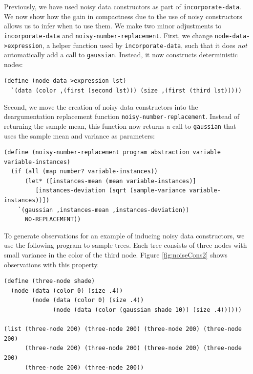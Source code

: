 \documentclass[a4paper,10pt]{article}
\begin{document}
Previously, we have used noisy data constructors as part of \texttt{incorporate-data}. We now show how the gain in compactness due to the use of noisy constructors allows us to infer when to use them. We make two minor adjustments to \texttt{incorporate-data} and \texttt{noisy-number-replacement}. First, we change \texttt{node-data->expression}, a helper function used by \texttt{incorporate-data}, such that it does \textit{not} automatically add a call to \texttt{gaussian}. Instead, it now constructs deterministic nodes:
\begin{lstlisting}[frame=trblsingle]
(define (node-data->expression lst)
  `(data (color ,(first (second lst))) (size ,(first (third lst)))))
\end{lstlisting}
Second, we move the creation of noisy data constructors into the deargumentation replacement function \texttt{noisy-number-replacement}. Instead of returning the sample mean, this function now returns a call to \texttt{gaussian} that uses the sample mean and variance as parameters:
\begin{lstlisting}[frame=trblsingle]
(define (noisy-number-replacement program abstraction variable variable-instances)
  (if (all (map number? variable-instances))
      (let* ([instances-mean (mean variable-instances)]
	     [instances-deviation (sqrt (sample-variance variable-instances))])
	`(gaussian ,instances-mean ,instances-deviation))
      NO-REPLACEMENT))
\end{lstlisting}



To generate observations for an example of inducing noisy data constructors, we use the following program to sample trees. Each tree consists of three nodes with small variance in the color of the third node. Figure \ref{fig:noiseCons2} shows observations with this property.
\begin{lstlisting}[mathescape=true]
(define (three-node shade)
  (node (data (color 0) (size .4))
        (node (data (color 0) (size .4)) 
              (node (data (color (gaussian shade 10)) (size .4))))))

(list (three-node 200) (three-node 200) (three-node 200) (three-node 200)
      (three-node 200) (three-node 200) (three-node 200) (three-node 200)
      (three-node 200) (three-node 200))
\end{lstlisting}
\end{document}
